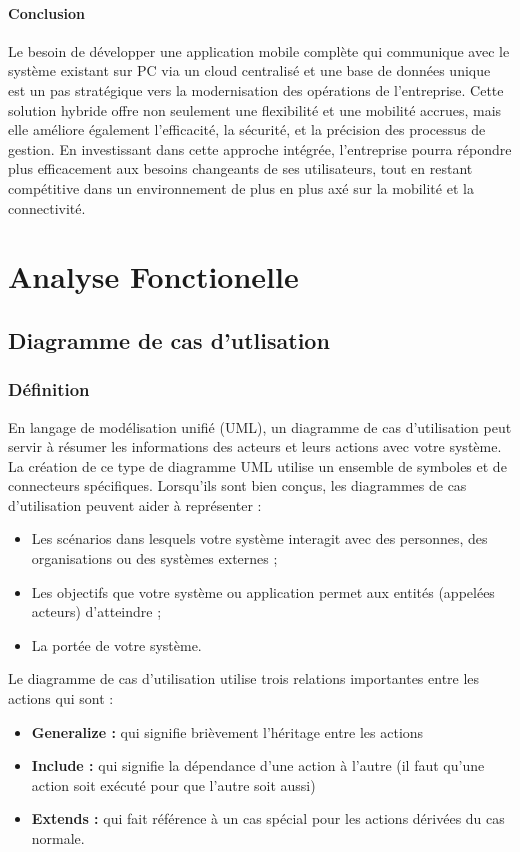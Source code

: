 \documentclass[a4paper, oneside, 12pt, final]{extreport}
\begin{document}
\subsubsection{Conclusion}
Le besoin de développer une application mobile complète qui communique avec le système existant sur PC via un cloud centralisé et une base de données unique est un pas stratégique vers la modernisation des opérations de l'entreprise. Cette solution hybride offre non seulement une flexibilité et une mobilité accrues, mais elle améliore également l'efficacité, la sécurité, et la précision des processus de gestion. En investissant dans cette approche intégrée, l'entreprise pourra répondre plus efficacement aux besoins changeants de ses utilisateurs, tout en restant compétitive dans un environnement de plus en plus axé sur la mobilité et la connectivité.

\chapter{Analyse Fonctionelle}
\section{Diagramme de cas d'utlisation}

\subsection{Définition}
En langage de modélisation unifié (UML), un diagramme de cas d'utilisation peut 
servir à résumer les informations des acteurs et leurs actions avec votre système. La 
création de ce type de diagramme UML utilise un ensemble de symboles et de 
connecteurs spécifiques. Lorsqu'ils sont bien conçus, les diagrammes de cas 
d'utilisation peuvent aider à représenter : 
\begin{itemize}
\item Les scénarios dans lesquels votre système interagit avec des personnes, des 
organisations ou des systèmes externes ; 
\item Les objectifs que votre système ou application permet aux entités (appelées acteurs) 
d'atteindre ; 
\item La portée de votre système. 
\end{itemize}
Le diagramme de cas d’utilisation utilise trois relations importantes entre les actions 
qui sont :  
\begin{itemize}
\item \textbf{ Generalize :} qui signifie brièvement l’héritage entre les actions 
\item \textbf{ Include :} qui signifie la dépendance d’une action à l’autre (il faut qu’une action soit 
exécuté pour que l’autre soit aussi) 
\item \textbf{Extends :} qui fait référence à un cas spécial pour les actions dérivées du cas normale.  
\end{itemize}
\end{document}
